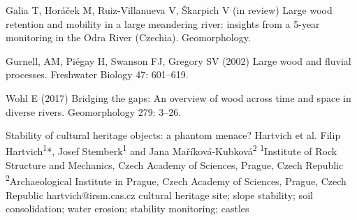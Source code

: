 {Galia T, Horáček M, Ruiz-Villanueva V, Škarpich V (in review) Large wood retention and mobility in a large meandering river: insights from a 5-year monitoring in the Odra River (Czechia). Geomorphology.
	
Gurnell, AM, Piégay H, Swanson FJ, Gregory SV (2002) Large wood and fluvial processes. Freshwater Biology 47: 601–619.
	
Wohl E (2017) Bridging the gaps: An overview of wood across time and space in diverse rivers. Geomorphology 279: 3–26.
}%

\abstract
{Stability of cultural heritage objects: a phantom menace?} 
{Hartvich et al.} 
{Filip Hartvich\textsuperscript{1}*, Josef Stemberk\textsuperscript{1} and Jana Maříková-Kubková\textsuperscript{2}} 
{\TLtag} 
{
\textsuperscript{1}Institute of Rock Structure and Mechanics, Czech Academy of Sciences, Prague, Czech Republic\\
\textsuperscript{2}Archaeological Institute in Prague, Czech Academy of Sciences, Prague, Czech Republic
}
{hartvich@irsm.cas.cz}  %
{cultural heritage site; slope stability; soil consolidation; water erosion; stability monitoring; castles}
